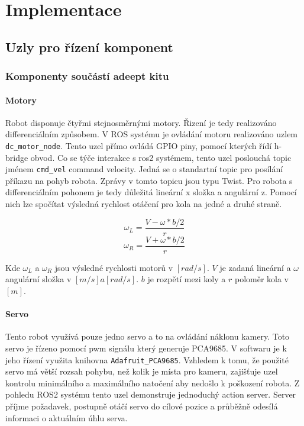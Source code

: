 \chapter{Implementace}


\section{Uzly pro řízení komponent}

\subsection*{Komponenty součástí adeept kitu}

\subsubsection*{Motory}
Robot disponuje čtyřmi stejnosměrnými motory. Řizení je tedy realizováno differenciálním způsobem. 
V ROS systému je ovládání motoru realizováno uzlem \verb|dc_motor_node|. Tento uzel přímo ovládá GPIO piny, pomocí kterých řídí h-bridge obvod. Co se týče interakce s ros2 systémem, tento uzel poslouchá topic jménem \verb|cmd_vel| command velocity. Jedná se o standartní topic pro posílání příkazu na pohyb robota. Zprávy v tomto topicu jsou typu Twist. Pro robota s differenciálním pohonem je tedy důležitá lineární x složka a angulární z. Pomocí nich lze spočítat výsledná rychlost otáčení pro kola na jedné a druhé straně.

$$\omega_L = \frac{V - \omega * b/2}{r}$$
$$\omega_R = \frac{V + \omega * b/2}{r}$$

\noindent Kde $\omega_L$ a $\omega_R$ jsou výsledné rychlosti motorů v $[rad/s]$. $V$ je zadaná lineární a $\omega$ angulární složka v $[m/s] a [rad/s]$. $b$ je rozpětí mezi koly a $r$ poloměr kola v $[m]$.


\subsubsection*{Servo}
Tento robot využívá pouze jedno servo a to na ovládání náklonu kamery. Toto servo je řízeno pomocí pwm signálu který generuje PCA9685. V softwaru je k jeho řízení využita knihovna \verb|Adafruit_PCA9685|. Vzhledem k tomu, že použité servo má větší rozsah pohybu, než kolik je místa pro kameru, zajišťuje uzel kontrolu minimálního a maximálního natočení aby nedošlo k poškození robota. Z pohledu ROS2 systému tento uzel demonstruje jednoduchý action server. Server příjme požadavek, postupně otáčí servo do cílové pozice a průběžně odesílá informaci o aktuálním úhlu serva.

